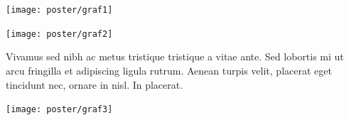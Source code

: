 \documentclass[a0,portrait]{a0poster}
\begin{document}
\begin{multicols}{2}
%
%

\begin{center}%
\texttt{[image: poster/graf1]}
\end{center}%

\begin{center}%
\texttt{[image: poster/graf2]}
\end{center}%

Vivamus sed nibh ac metus tristique tristique a vitae ante. Sed lobortis
mi ut arcu fringilla et adipiscing ligula rutrum. Aenean turpis velit,
placerat eget tincidunt nec, ornare in nisl. In placerat.

\begin{center}%
\texttt{[image: poster/graf3]}
\end{center}%




\end{multicols}
\end{document}
